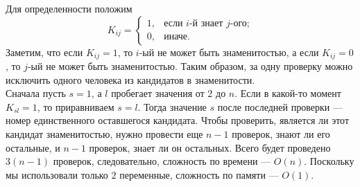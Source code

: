 \documentclass{article}
\begin{document}
Для определенности положим
$$K_{ij} = \begin{cases} 1,&\text{если } i\text{-й знает }j\text{-ого;}\\ 0,&\text{иначе.}\end{cases}$$
Заметим, что если $K_{ij} = 1$, то $i$-ый не может быть знаменитостью, а если $K_{ij} = 0$, то $j$-ый не может быть знаменитостью. Таким образом, за 
одну проверку можно исключить одного человека из кандидатов в знаменитости.\\
Сначала пусть $s=1$, а $l$ пробегает значения от $2$ до $n$. Если в какой-то момент $K_{sl}=1$, то приравниваем $s=l$. Тогда значение 
$s$ после последней проверки --- номер единственного оставшегося кандидата. Чтобы проверить, является ли этот кандидат знаменитостью, нужно провести еще 
$n-1$ проверок, знают ли его остальные, и $n-1$ проверок, знает ли он остальных. Всего будет проведено $3(n-1)$ проверок, следовательно, сложность по времени --- $O(n)$. 
Поскольку мы использовали только $2$ переменные, сложность по памяти --- $O(1)$.
\end{document}
